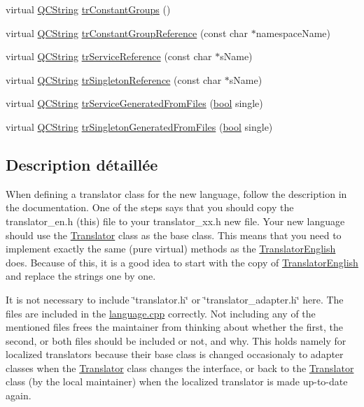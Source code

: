 \begin{DoxyCompactItemize}
\item 
virtual \hyperlink{class_q_c_string}{Q\+C\+String} \hyperlink{class_translator_english_a035575d56336402ab3b2103747f4b429}{tr\+Constant\+Groups} ()
\item 
virtual \hyperlink{class_q_c_string}{Q\+C\+String} \hyperlink{class_translator_english_a69b97a9ad8ce2472c65afb89547a13e5}{tr\+Constant\+Group\+Reference} (const char $\ast$namespace\+Name)
\item 
virtual \hyperlink{class_q_c_string}{Q\+C\+String} \hyperlink{class_translator_english_a044df870524c280750c8e57b2d85a465}{tr\+Service\+Reference} (const char $\ast$s\+Name)
\item 
virtual \hyperlink{class_q_c_string}{Q\+C\+String} \hyperlink{class_translator_english_a4fb80aae0c36727d7b93123b656427c2}{tr\+Singleton\+Reference} (const char $\ast$s\+Name)
\item 
virtual \hyperlink{class_q_c_string}{Q\+C\+String} \hyperlink{class_translator_english_a337e0ced64f3b90a78ac71a8c0929a6e}{tr\+Service\+Generated\+From\+Files} (\hyperlink{qglobal_8h_a1062901a7428fdd9c7f180f5e01ea056}{bool} single)
\item 
virtual \hyperlink{class_q_c_string}{Q\+C\+String} \hyperlink{class_translator_english_a96741d8aecb5a3f7fb51a085b3937885}{tr\+Singleton\+Generated\+From\+Files} (\hyperlink{qglobal_8h_a1062901a7428fdd9c7f180f5e01ea056}{bool} single)
\end{DoxyCompactItemize}


\subsection{Description détaillée}
When defining a translator class for the new language, follow the description in the documentation. One of the steps says that you should copy the translator\+\_\+en.\+h (this) file to your translator\+\_\+xx.\+h new file. Your new language should use the \hyperlink{class_translator}{Translator} class as the base class. This means that you need to implement exactly the same (pure virtual) methods as the \hyperlink{class_translator_english}{Translator\+English} does. Because of this, it is a good idea to start with the copy of \hyperlink{class_translator_english}{Translator\+English} and replace the strings one by one.

It is not necessary to include \char`\"{}translator.\+h\char`\"{} or \char`\"{}translator\+\_\+adapter.\+h\char`\"{} here. The files are included in the \hyperlink{language_8cpp}{language.\+cpp} correctly. Not including any of the mentioned files frees the maintainer from thinking about whether the first, the second, or both files should be included or not, and why. This holds namely for localized translators because their base class is changed occasionaly to adapter classes when the \hyperlink{class_translator}{Translator} class changes the interface, or back to the \hyperlink{class_translator}{Translator} class (by the local maintainer) when the localized translator is made up-\/to-\/date again. 

